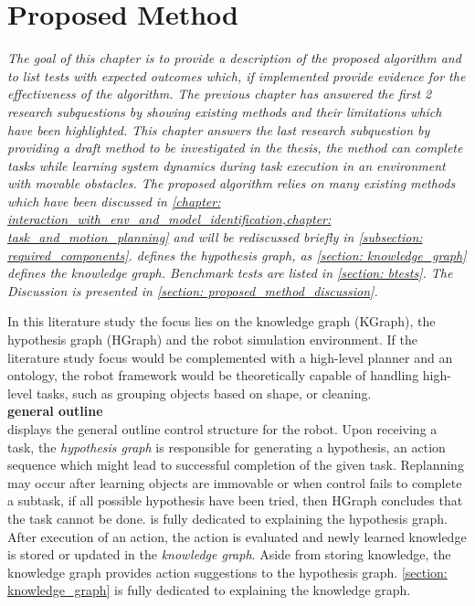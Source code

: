 \chapter{Proposed Method}
\label{chapter: proposed_method}
\textit{The goal of this chapter is to provide a description of the proposed algorithm and to list tests with expected outcomes which, if implemented provide evidence for the effectiveness of the algorithm. The previous chapter has answered the first 2 research subquestions by showing existing methods and their limitations which have been highlighted. This chapter answers the last research subquestion by providing a draft method to be investigated in the thesis, the method can complete tasks while learning system dynamics during task execution in an environment with movable obstacles. The proposed algorithm relies on many existing methods which have been discussed in \cref{chapter: interaction_with_env_and_model_identification,chapter: task_and_motion_planning} and will be rediscussed briefly in \cref{subsection: required_components}.  defines the hypothesis graph, as \cref{section: knowledge_graph} defines the knowledge graph. Benchmark tests are listed in \cref{section: btests}. The Discussion is presented in \cref{section: proposed_method_discussion}.\\}

In this literature study the focus lies on the knowledge graph (KGraph), the hypothesis graph (HGraph) and the robot simulation environment. If the literature study focus would be complemented with a high-level planner and an ontology, the robot framework would be theoretically capable of handling high-level tasks, such as grouping objects based on shape, or cleaning.\\

\textbf{\large general outline\\}
\noindent {} displays the general outline control structure for the robot. Upon receiving a task, the \textit{hypothesis graph} is responsible for generating a hypothesis, an action sequence which might lead to successful completion of the given task. Replanning may occur after learning objects are immovable or when control fails to complete a subtask, if all possible hypothesis have been tried, then HGraph concludes that the task cannot be done.  is fully dedicated to explaining the hypothesis graph.\\

After execution of an action, the action is evaluated and newly learned knowledge is stored or updated in the \textit{knowledge graph}. Aside from storing knowledge, the knowledge graph provides action suggestions to the hypothesis graph. \cref{section: knowledge_graph} is fully dedicated to explaining the knowledge graph.\\

